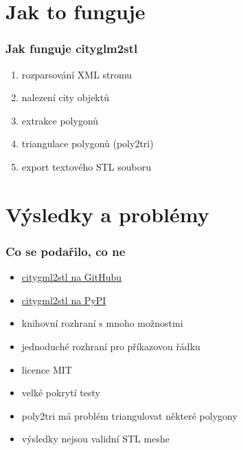 \documentclass{beamer}
\begin{document}
\section{Jak to funguje}

\begin{frame}
  \frametitle{Jak funguje cityglm2stl}
    \begin{enumerate}[<+->]
      \item rozparsování XML stromu
      \item nalezení city objektů
      \item extrakce polygonů
      \item triangulace polygonů (poly2tri)
      \item export textového STL souboru
    \end{enumerate}
\end{frame}

\section{Výsledky a problémy}

\begin{frame}
  \frametitle{Co se podařilo, co ne}
    \begin{itemize}[<+->]
      \item \href{https://github.com/ctu-yfsg/2015-f-citygml}{citygml2stl na GitHubu}
      \item \href{http://pypi.python.org/pypi/citygml2stl}{citygml2stl na PyPI}
      \item knihovní rozhraní s mnoho možnostmi
      \item jednoduché rozhraní pro příkazovou řádku
      \item licence MIT
      \item velké pokrytí testy
      \item poly2tri má problém triangulovat některé polygony
      \item výsledky nejsou validní STL meshe
    \end{itemize}
\end{frame}
\end{document}
